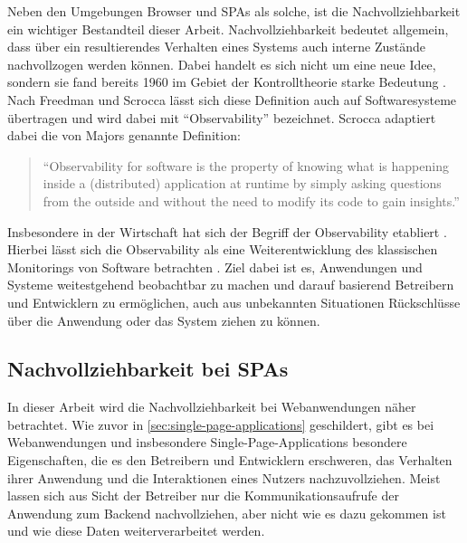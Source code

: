 Neben den Umgebungen Browser und SPAs als solche, ist die Nachvollziehbarkeit ein wichtiger Bestandteil dieser Arbeit. Nachvollziehbarkeit bedeutet allgemein, dass über ein resultierendes Verhalten eines Systems auch interne Zustände nachvollzogen werden können. Dabei handelt es sich nicht um eine neue Idee, sondern sie fand bereits 1960 im Gebiet der Kontrolltheorie starke Bedeutung \cite{OnTheGeneralTheoryOfControlSystems}. Nach Freedman \cite{TestabilityOfSoftwareComponents} und Scrocca \etal \cite{TheKaijuProjectPaper} lässt sich diese Definition auch auf Softwaresysteme übertragen und wird dabei mit \enquote{Observability} bezeichnet. Scrocca adaptiert dabei die von Majors \cite{MajorsObservability} genannte Definition:

\begin{quotation}
\enquote{Observability for software is the property of knowing what is happening inside a (distributed) application at runtime by simply asking questions from the outside and without the need to modify its code to gain insights.}
\end{quotation}

Insbesondere in der Wirtschaft hat sich der Begriff der Observability etabliert \cite{DynatraceObservability} \cite{NewRelicObservability}. Hierbei lässt sich die Observability als eine Weiterentwicklung des klassischen Monitorings von Software betrachten \cite{TheNewStackMonitoringAndObservability}. Ziel dabei ist es, Anwendungen und Systeme weitestgehend beobachtbar zu machen und darauf basierend Betreibern und Entwicklern zu ermöglichen, auch aus unbekannten Situationen Rückschlüsse über die Anwendung oder das System ziehen zu können.

\subsection{Nachvollziehbarkeit bei SPAs}
\label{sec:nachvollziehbarkeit-bei-spas}

In dieser Arbeit wird die Nachvollziehbarkeit bei Webanwendungen näher betrachtet. Wie zuvor in \autoref{sec:single-page-applications} geschildert, gibt es bei Webanwendungen und insbesondere Single-Page-Applications besondere Eigenschaften, die es den Betreibern und Entwicklern erschweren, das Verhalten ihrer Anwendung und die Interaktionen eines Nutzers nachzuvollziehen. Meist lassen sich aus Sicht der Betreiber nur die Kommunikationsaufrufe der Anwendung zum Backend nachvollziehen, aber nicht wie es dazu gekommen ist und wie diese Daten weiterverarbeitet werden.

